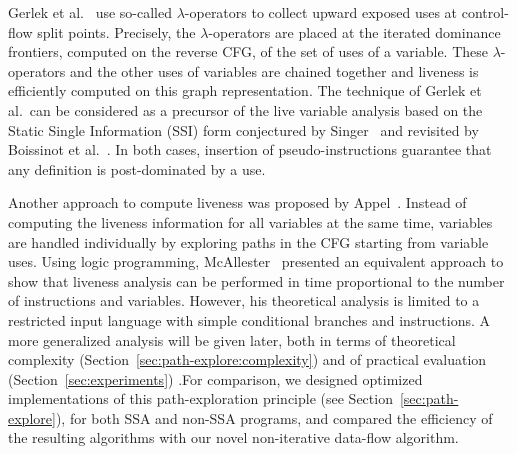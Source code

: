 Gerlek et al.~\cite{gerlek94reference} use so-called $\lambda$-operators to collect upward exposed uses at control-flow split points.
Precisely, the $\lambda$-operators are placed at the iterated dominance frontiers, computed on the reverse CFG, of the set of uses of a variable.
These $\lambda$-operators and the other uses of variables are chained together and liveness is efficiently computed on this graph representation.
The technique of Gerlek et al.~can be considered as a precursor of the live variable analysis based on the Static Single Information (SSI) form conjectured by Singer~\cite{singer:2006:phd} and revisited by Boissinot et al.~\cite{BoissinotBDR12}.
In both cases, insertion of pseudo-instructions guarantee that any definition is post-dominated by a use.

Another approach to compute liveness was proposed by
Appel~\cite[p.~429]{appel:2002:modern}. Instead of computing the liveness
information for all variables at the same time, variables are handled
individually by exploring paths in the CFG starting from variable uses. 
Using logic programming, McAllester~\cite{M02} presented an equivalent approach to show that liveness analysis can be performed in time
proportional to the number of instructions and variables.
However, his theoretical analysis is limited to a restricted input language
with simple conditional branches and instructions.
A more generalized analysis will be given later, both in terms of theoretical complexity (Section~\ref{sec:path-explore:complexity}) and of practical evaluation (Section~\ref{sec:experiments})
.For comparison, we designed optimized implementations of this path-exploration principle (see Section~\ref{sec:path-explore}), for both SSA and non-SSA programs, and compared the efficiency of the resulting algorithms with our novel non-iterative data-flow algorithm.



